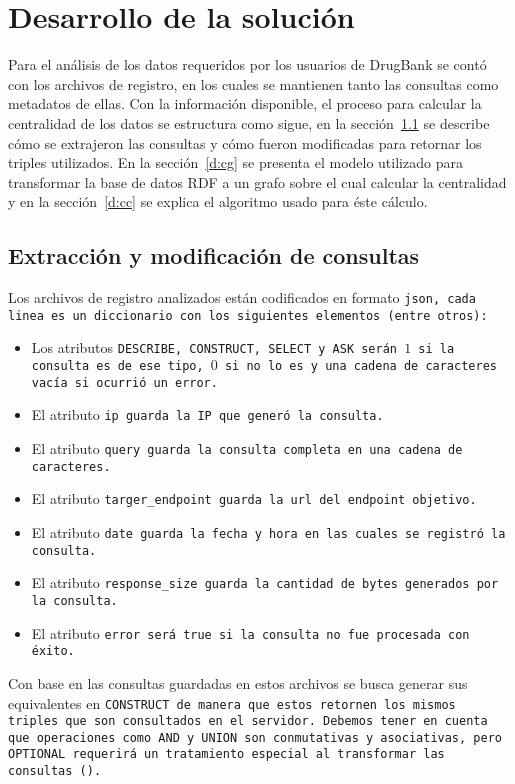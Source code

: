 
\chapter{Desarrollo de la solución}\label{c:desarrollo}

Para el análisis de los datos requeridos por los usuarios de DrugBank se contó
con los archivos de registro, en los cuales se mantienen tanto las consultas
como metadatos de ellas.
Con la información disponible, el proceso para calcular la
centralidad de los datos se estructura como sigue, en la sección~\ref{d:emc}
se describe cómo se extrajeron las consultas y cómo fueron modificadas para
retornar los triples utilizados. En la sección~\ref{d:cg} se presenta el modelo
utilizado para transformar la base de datos RDF a un grafo sobre el cual
calcular la centralidad y en la sección~\ref{d:cc} se explica el algoritmo
usado para éste cálculo.

\section{Extracción y modificación de consultas}\label{d:emc}
Los archivos de registro analizados están codificados en formato \tt{json},
cada linea es un diccionario con los siguientes elementos (entre otros):
\begin{itemize}
  \item
    Los atributos \tt{DESCRIBE}, \tt{CONSTRUCT}, \tt{SELECT} y \tt{ASK} serán
    $1$ si la consulta es de ese tipo, $0$ si no lo es y una cadena de
    caracteres vacía si ocurrió un error.
  \item
    El atributo \tt{ip} guarda la IP que generó la consulta.
  \item
    El atributo \tt{query} guarda la consulta completa en una cadena de
    caracteres. 
  \item
    El atributo \tt{targer\_endpoint} guarda la \tt{url} del \tt{endpoint}
    objetivo.
  \item
    El atributo \tt{date} guarda la fecha y hora en las cuales se registró la
    consulta.
  \item
    El atributo \tt{response\_size} guarda la cantidad de bytes generados por la
    consulta.
  \item
    El atributo \tt{error} será \tt{true} si la consulta no fue procesada con
    éxito.
\end{itemize}

Con base en las consultas guardadas en estos archivos se busca generar sus
equivalentes en \tt{CONSTRUCT} de manera que estos retornen los mismos triples
que son consultados en el servidor.
Debemos tener en cuenta que operaciones como \tt{AND} y \tt{UNION} son
conmutativas y asociativas, pero \tt{OPTIONAL} requerirá un tratamiento especial
al transformar las consultas (\cite{perez2006semantics}).

